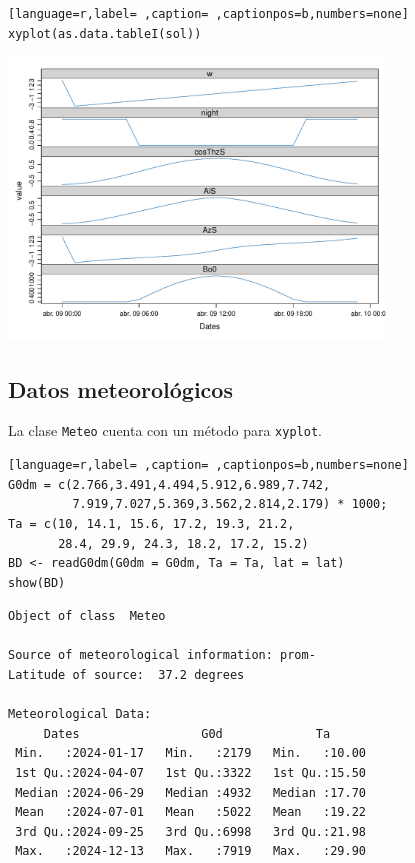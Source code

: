 \begin{lstlisting}[language=r,label= ,caption= ,captionpos=b,numbers=none]
xyplot(as.data.tableI(sol))
\end{lstlisting}
\begin{center}
\includegraphics[keepaspectratio,width=0.75\textwidth,height=0.5\textheight]{figuras/codigo-sol.pdf}
\end{center}

\subsection{Datos meteorológicos}
\label{sec:orgf20860e}
La clase \texttt{Meteo} cuenta con un método para \texttt{xyplot}.
\begin{lstlisting}[language=r,label= ,caption= ,captionpos=b,numbers=none]
G0dm = c(2.766,3.491,4.494,5.912,6.989,7.742,
         7.919,7.027,5.369,3.562,2.814,2.179) * 1000;
Ta = c(10, 14.1, 15.6, 17.2, 19.3, 21.2,
       28.4, 29.9, 24.3, 18.2, 17.2, 15.2)
BD <- readG0dm(G0dm = G0dm, Ta = Ta, lat = lat)
show(BD)
\end{lstlisting}

\begin{verbatim}
Object of class  Meteo 

Source of meteorological information: prom- 
Latitude of source:  37.2 degrees

Meteorological Data:
     Dates                 G0d             Ta       
 Min.   :2024-01-17   Min.   :2179   Min.   :10.00  
 1st Qu.:2024-04-07   1st Qu.:3322   1st Qu.:15.50  
 Median :2024-06-29   Median :4932   Median :17.70  
 Mean   :2024-07-01   Mean   :5022   Mean   :19.22  
 3rd Qu.:2024-09-25   3rd Qu.:6998   3rd Qu.:21.98  
 Max.   :2024-12-13   Max.   :7919   Max.   :29.90
\end{verbatim}

